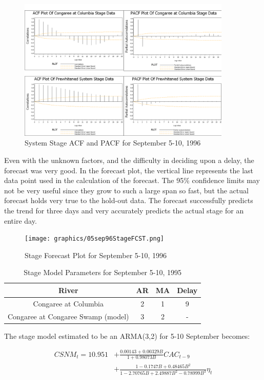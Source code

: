 \documentclass[12pt]{report}
\begin{document}
\begin{figure}[h]
\centering\includegraphics[width=4in]{prodgraph/05sepstagediag.png}
\centering\caption{System Stage ACF and PACF for September 5-10,
1996}\label{fig:sepstagediag}
\end{figure}

Even with the unknown factors, and the difficulty in deciding upon
a delay, the forecast was very good.  In the forecast plot, the
vertical line represents the last data point used in the
calculation of the forecast. The 95\% confidence limits may not be
very useful since they grow to such a large span so fast, but the
actual forecast holds very true to the hold-out data.  The
forecast successfully predicts the trend for three days and very
accurately predicts the actual stage for an entire day.
\begin{figure}[h]
\centering\texttt{[image: graphics/05sep96StageFCST.png]}
\centering\caption{Stage Forecast Plot for September 5-10, 1996}
\end{figure}


\begin{table}[h]
\begin{centering}
\begin{tabular}{|c|c|c|c|}
\hline \textbf{River} & \textbf{AR} & \textbf{MA} & \textbf{Delay} \\
\hline Congaree at Columbia & 2 & 1 & 9 \\
Congaree at Congaree Swamp (model) & 3 & 2 & - \\
\hline
\end{tabular}\caption{Stage Model Parameters for September 5-10, 1995}
\end{centering}
\end{table}


The stage model estimated to be an ARMA(3,2) for 5-10 September
becomes:

\begin{equation}
\begin{split}
\label{eq:5sepstagemodel}
CSNM_t=10.951&+\frac{0.00143+0.00329B}{1+0.98073B}CAC_{t-9}\\
&+\frac{1-0.1747B+0.48465B^2}{1-2.70765B+2.49887B^2-0.78999B^3}\eta_t\\
\end{split}
\end{equation}
\end{document}
